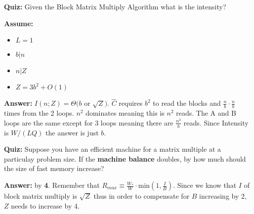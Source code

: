 \documentclass{amsart}
\begin{document}
	\begin{mdframed}[style=Quiz]
		\textbf{Quiz:} Given the Block Matrix Multiply Algorithm what is the intensity?
		
		\noindent
		\textbf{Assume:}
		\begin{itemize}
			\item $L = 1$
			\item $b | n$
			\item $n | Z$
			\item $Z=3b^2 + O(1)$
		\end{itemize}
		
		\noindent
		\textbf{Answer:} $I(n;Z) = \Theta(b$ or $\sqrt{Z})$. $\hat{C}$ requires $b^2$ to read the blocks and $\frac{n}{b} \cdot \frac{n}{b}$ times from the 2 loops. $n^2$ dominates meaning this is $n^2$ reads. The A and B loops are the same except for 3 loops meaning there are $\frac{n^3}{b}$ reads. Since Intensity is $W/(LQ)$ the answer is just $b$.
	\end{mdframed}
	\begin{mdframed}[style=Quiz]
		\textbf{Quiz: } Suppose you have an efficient machine for a matrix multiple at a particulay problem size. If the \textbf{machine balance} doubles, by how much should the size of fast memory increase?
		
		
		\noindent
		\textbf{Answer: } by \textbf{4}. Remember that  $R_{max} \equiv \frac{W_*}{W} \cdot$min$(1,\frac{I}{B})$. Since we know that $I$ of block matrix multiply is $\sqrt{Z}$ thus in order to compensate for $B$ increasing by 2, $Z$ needs to increase by 4.
	\end{mdframed}
	\clearpage
\end{document}
